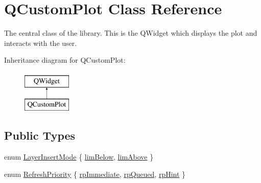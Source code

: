 \hypertarget{class_q_custom_plot}{}\section{Q\+Custom\+Plot Class Reference}
\label{class_q_custom_plot}


The central class of the library. This is the Q\+Widget which displays the plot and interacts with the user.  


Inheritance diagram for Q\+Custom\+Plot\+:\begin{figure}[H]
\begin{center}
\leavevmode
\includegraphics[height=2.000000cm]{class_q_custom_plot}
\end{center}
\end{figure}
\subsection*{Public Types}
\begin{DoxyCompactItemize}
\item 
enum \hyperlink{class_q_custom_plot_a75a8afbe6ef333b1f3d47abb25b9add7}{Layer\+Insert\+Mode} \{ \hyperlink{class_q_custom_plot_a75a8afbe6ef333b1f3d47abb25b9add7aee39cf650cd24e68552da0b697ce4a93}{lim\+Below}, 
\hyperlink{class_q_custom_plot_a75a8afbe6ef333b1f3d47abb25b9add7a062b0b7825650b432a713c0df6742d41}{lim\+Above}
 \}
\item 
enum \hyperlink{class_q_custom_plot_a45d61392d13042e712a956d27762aa39}{Refresh\+Priority} \{ \hyperlink{class_q_custom_plot_a45d61392d13042e712a956d27762aa39a0d4831572370d871f2b7cb88806bac59}{rp\+Immediate}, 
\hyperlink{class_q_custom_plot_a45d61392d13042e712a956d27762aa39aaaae083a19bc668597bf0f86e000f798}{rp\+Queued}, 
\hyperlink{class_q_custom_plot_a45d61392d13042e712a956d27762aa39adfa1f2387617168d9299f4c8ad15b332}{rp\+Hint}
 \}
\end{DoxyCompactItemize}
